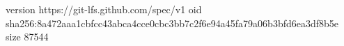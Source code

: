 version https://git-lfs.github.com/spec/v1
oid sha256:8a472aaa1cbfcc43abca4cce0cbc3bb7c2f6e94a45fa79a06b3bfd6ea3df8b5e
size 87544
